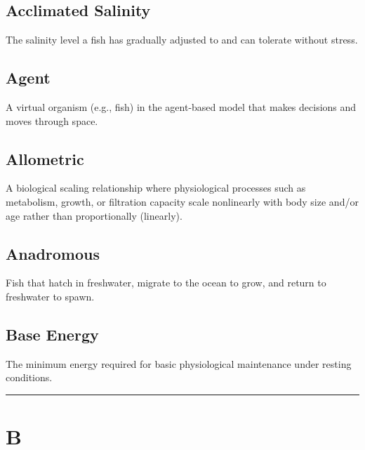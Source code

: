 \documentclass[
]{book}
\begin{document}
\subsection{\texorpdfstring{\textbf{Acclimated Salinity}}{Acclimated Salinity}}\label{acclimated-salinity}

The salinity level a fish has gradually adjusted to and can tolerate without stress.

\subsection{\texorpdfstring{\textbf{Agent}}{Agent}}\label{agent}

A virtual organism (e.g., fish) in the agent-based model that makes decisions and moves through space.

\subsection{\texorpdfstring{\textbf{Allometric}}{Allometric}}\label{allometric}

A biological scaling relationship where physiological processes such as metabolism, growth, or filtration capacity scale nonlinearly with body size and/or age rather than proportionally (linearly).

\subsection{\texorpdfstring{\textbf{Anadromous}}{Anadromous}}\label{anadromous}

Fish that hatch in freshwater, migrate to the ocean to grow, and return to freshwater to spawn.

\subsection{\texorpdfstring{\textbf{Base Energy}}{Base Energy}}\label{base-energy}

The minimum energy required for basic physiological maintenance under resting conditions.

\begin{center}\rule{0.5\linewidth}{0.5pt}\end{center}

\section*{B}\label{b}
\end{document}
